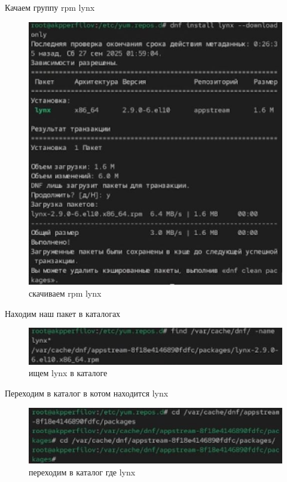 \documentclass[
  english,
  russian,
  12pt,
  a4paper,
  DIV=11,
  numbers=noendperiod]{scrreprt}
\begin{document}
Качаем группу rpm lynx

\begin{figure}

{\centering \includegraphics[width=0.71\linewidth,height=\textheight,keepaspectratio]{image/18.jpg}

}

\caption{скачиваем rpm lynx}

\end{figure}%

Находим наш пакет в каталогах

\begin{figure}

{\centering \includegraphics[width=0.71\linewidth,height=\textheight,keepaspectratio]{image/19.jpg}

}

\caption{ищем lynx в каталоге}

\end{figure}%

Переходим в каталог в котом находится lynx

\begin{figure}

{\centering \includegraphics[width=0.71\linewidth,height=\textheight,keepaspectratio]{image/20.jpg}

}

\caption{переходим в каталог где lynx}

\end{figure}%
\end{document}
